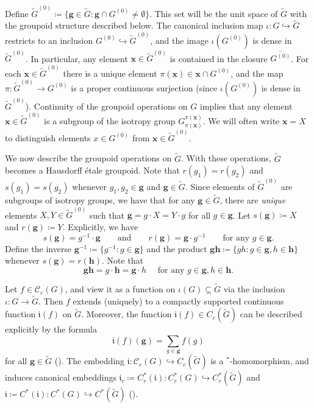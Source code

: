 \documentclass[11pt, oneside, reqno]{amsart}
\newcommand{\Gu}{G^{(0)}}
\newcommand{\cg}{\mathscr{C}_c(G)}
\newcommand{\tiG}{\tilde{G}}
\newcommand{\tiGu}{\tilde{G}^{(0)}}
\newcommand{\mfi}{\mathfrak i}
\theoremstyle{definition}
\theoremstyle{remark}
\numberwithin{equation}{section}
\begin{document}
Define $\tiGu \coloneq \{\bm{g} \in \tiG \colon \bm{g} \cap \Gu \neq \emptyset\}$. This set will be the unit space of $\tiG$ with the groupoid structure described below. The canonical inclusion map $\iota \colon G \hookrightarrow \tiG$ restricts to an inclusion $\Gu \hookrightarrow \tiGu$, and the image $\iota(\Gu)$ is dense in $\tiGu$. In particular, any element $\bm{x} \in \tiGu$ is contained in the closure $\overline{\Gu}$. For each $\bm{x} \in \tiGu$ there is a unique element $ \pi(\bm{x})\in \bm{x}\cap \Gu$, and the map $\pi \colon \tiGu \to \Gu$ is a proper continuous surjection (since $\iota(\Gu)$ is dense in $\tiGu$). Continuity of the groupoid operations on $G$ implies that any element $\bm{x} \in \tiGu$ is a subgroup of the isotropy group $G_{\pi(\bm{x})}^{\pi(\bm{x})}$. We will often write $\bm{x} = X$ to distinguish elements $x\in\Gu$ from $\bm{x}\in \tiGu$.


We now describe the groupoid operations on $\tiG$. With these operations, $\tiG$ becomes a Hausdorff \'etale groupoid. Note that $r(g_1) = r(g_2)$ and $s(g_1) = s(g_2)$ whenever $g_1, g_2 \in \bm{g}$ and $\bm{g} \in \tiG$. Since elements of $\tiGu$ are subgroups of isotropy groups, we have that for any $\bm{g}\in \tiG$, there are \emph{unique} elements $X, Y\in \tiGu$ such that $\bm{g} = g\cdot X = Y\cdot g$ for all $g\in\bm{g}$. Let $s(\bm{g}) \coloneq X$ and $r(\bm{g}) \coloneq Y$. Explicitly, we have
\begin{equation}\label{RangeSourceinCover}
    s(\bm{g}) = g^{-1} \cdot \bm{g} \quad\quad \text{and} \quad\quad r(\bm{g}) = \bm{g} \cdot g^{-1} \quad\quad \text{for any }  g \in \bm{g}.
\end{equation}
Define the inverse $\bm{g}^{-1} \coloneq \{g^{-1} \colon g \in \bm{g}\}$ and the product $\bm{g}\bm{h} \coloneq \{gh \colon g \in \bm{g}, h \in \bm{h}\}$ whenever $s(\bm{g}) = r(\bm{h})$. Note that
\begin{equation}\label{MultInCover}
\bm{g}\bm{h} = g \cdot \bm{h} = \bm{g} \cdot h \quad \text{ for any } g \in \bm{g}, h \in \bm{h}.
\end{equation}
\vspace{-0.1cm}

Let $f \in \cg$, and view it as a function on $\iota(G) \subseteq \tiG$ via the inclusion $\iota \colon G \to \tiG$. Then $f$ extends (uniquely) to a compactly supported continuous function $\mfi(f)$ on $\tiG$. Moreover, the function $\mfi(f) \in C_c(\tiG)$ can be described explicitly by the formula
\begin{equation}\label{Cond1}
\mfi(f)(\bm{g}) = \sum_{g \in \bm{g}} f(g)
\end{equation}
for all $\bm{g} \in \tiG$ (\cite[Lemma~3.2]{BGHL}). The embedding $\mfi \colon \cg \hookrightarrow C_c(\tiG)$ is a $^*$-homomorphism, and induces canonical embeddings $\mfi_{r} \coloneq C^*_r(\mfi) \colon C^*_r(G) \hookrightarrow C^*_r(\tiG)$ and $\mfi \coloneq C^*(\mfi) \colon C^*(G) \hookrightarrow C^*(\tiG)$ (\cite[Lemma~3.8 \& Corollary~6.8]{BGHL}). 
\end{document}
